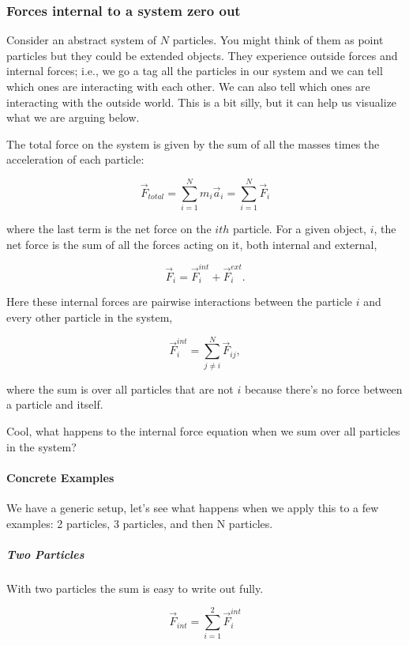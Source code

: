 \documentclass[11pt]{article}
\begin{document}
    \subsubsection{Forces internal to a system zero
out}\label{forces-internal-to-a-system-zero-out}

Consider an abstract system of \(N\) particles. You might think of them
as point particles but they could be extended objects. They experience
outside forces and internal forces; i.e., we go a tag all the particles
in our system and we can tell which ones are interacting with each
other. We can also tell which ones are interacting with the outside
world. This is a bit silly, but it can help us visualize what we are
arguing below.

The total force on the system is given by the sum of all the masses
times the acceleration of each particle:

\[\vec{F}_{total} = \sum_{i=1}^{N} m_i\vec{a}_i = \sum_{i=1}^{N} \vec{F}_i\]

where the last term is the net force on the \(ith\) particle. For a
given object, \(i\), the net force is the sum of all the forces acting
on it, both internal and external,

\[\vec{F}_{i} = \vec{F}_{i}^{int} + \vec{F}_{i}^{ext}.\]

Here these internal forces are pairwise interactions between the
particle \(i\) and every other particle in the system,

\[\vec{F}_{i}^{int} = \sum_{j\neq i}^{N} \vec{F}_{ij},\]

where the sum is over all particles that are not \(i\) because there's
no force between a particle and itself.

Cool, what happens to the internal force equation when we sum over all
particles in the system?

\paragraph{Concrete Examples}\label{concrete-examples}

We have a generic setup, let's see what happens when we apply this to a
few examples: 2 particles, 3 particles, and then N particles.

\subparagraph{Two Particles}\label{two-particles}

With two particles the sum is easy to write out fully.

\[\vec{F}_{int} = \sum_{i=1}^{2} \vec{F}_{i}^{int}\]
\end{document}
